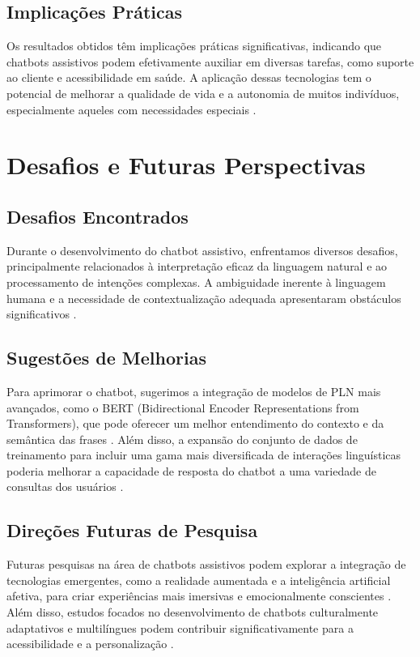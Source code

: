 \documentclass[conference]{IEEEtran}
\begin{document}
\subsection{Implicações Práticas}
Os resultados obtidos têm implicações práticas significativas, indicando que chatbots assistivos podem efetivamente auxiliar em diversas tarefas, 
como suporte ao cliente e acessibilidade em saúde. 
A aplicação dessas tecnologias tem o potencial de melhorar a qualidade de vida e a autonomia de muitos indivíduos, 
especialmente aqueles com necessidades especiais \cite{Goggin2003}.



\section{Desafios e Futuras Perspectivas}

\subsection{Desafios Encontrados}
Durante o desenvolvimento do chatbot assistivo, enfrentamos diversos desafios, 
principalmente relacionados à interpretação eficaz da linguagem natural e ao processamento de intenções complexas. 
A ambiguidade inerente à linguagem humana e a necessidade de contextualização adequada 
apresentaram obstáculos significativos \cite{Chowdhary2020}.

\subsection{Sugestões de Melhorias}
Para aprimorar o chatbot, sugerimos a integração de modelos de PLN mais avançados, 
como o BERT (Bidirectional Encoder Representations from Transformers), que pode oferecer 
um melhor entendimento do contexto e da semântica das frases \cite{Devlin2019}. 
Além disso, a expansão do conjunto de dados de treinamento para incluir uma 
gama mais diversificada de interações linguísticas poderia 
melhorar a capacidade de resposta do chatbot 
a uma variedade de consultas dos usuários \cite{Hastie2009}.

\subsection{Direções Futuras de Pesquisa}
Futuras pesquisas na área de chatbots assistivos podem explorar a integração de tecnologias emergentes, 
como a realidade aumentada e a inteligência artificial afetiva, para criar experiências mais imersivas e 
emocionalmente conscientes \cite{Picard2000}. 
Além disso, estudos focados no desenvolvimento de chatbots culturalmente adaptativos e multilíngues podem 
contribuir significativamente para a acessibilidade e a personalização \cite{McTear2016}.
\end{document}
